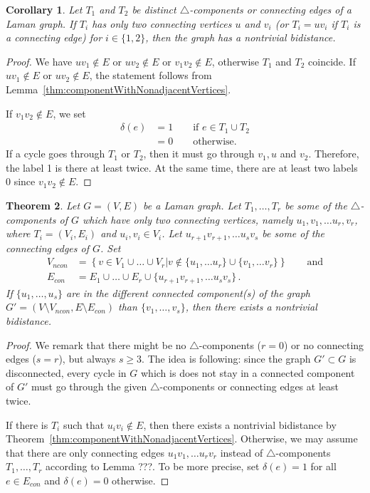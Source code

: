 \documentclass[a4paper, 11pt]{article}
\newcommand{\trcomps}{$\triangle$-components}
\newtheorem{thm}{Theorem}[section]
\newtheorem{cor}[thm]{Corollary}
\theoremstyle{definition}
\begin{document}
\begin{cor}
Let $T_1$ and $T_2$ be distinct \trcomps{} or connecting edges of a Laman graph. If $T_i$ has only two connecting vertices $u$ and $v_i$ (or $T_i=uv_i$ if $T_i$ is a connecting edge) for $i\in\{1,2\}$, then  the graph has a nontrivial bidistance.
\end{cor}
\begin{proof}
We have $uv_1\notin E$ or $uv_2\notin E$ or $v_1v_2\notin E$, otherwise $T_1$ and $T_2$ coincide.
If $uv_1\notin E$ or $uv_2\notin E$, the statement follows from Lemma~\ref{thm:componentWithNonadjacentVertices}.

If $v_1v_2\notin E$, we set 
\begin{align*}
\delta(e)&=1 \qquad \text{if } e\in T_1\cup T_2 \\
		&=0 \qquad \text{otherwise.}
\end{align*} 
If a cycle goes through $T_1$ or $T_2$, then it must go through  $v_1, u$ and $v_2$. Therefore, the label 1 is there at least twice. At the same time, there are at least two labels 0 since  $v_1v_2\notin E$.
\end{proof}

\begin{thm}
Let $G=(V,E)$ be a Laman graph. Let  $T_1, \dots, T_r$ be some of the \trcomps{} of $G$ which have only two connecting vertices, namely $u_1, v_1, \dots u_r,v_r$, where  $T_i=(V_i,E_i)$ and $u_i, v_i\in V_i$. Let  $u_{r+1}v_{r+1}, \dots u_s v_s$ be some of the connecting edges of $G$. Set 
\begin{align*}
V_{ncon}&=\left\{v\in V_1 \cup \dots \cup V_r | v\notin \{u_1, \dots u_r\}\cup \{v_1, \dots v_r\} \right\} \qquad \text{and} \\
E_{con}&=E_1 \cup \dots \cup E_r \cup \{u_{r+1}v_{r+1}, \dots u_s v_s\}\,.
\end{align*}
If $\{u_1, \dots, u_s\}$ are in the different connected component(s) of the graph $G'=(V\setminus V_{ncon},E\setminus E_{con})$ than $\{v_1, \dots, v_s\}$, then there exists a nontrivial bidistance.
\end{thm}
\begin{proof}
We remark that there might be no \trcomps{} ($r=0$) or no connecting edges ($s=r$), but always $s\geq 3$.
The idea is following: since the graph $G'\subset G$ is disconnected, every cycle in $G$ which is does not stay in a connected component of $G'$ must go through the given \trcomps{} or connecting edges at least twice.

If there is $T_i$ such that $u_i v_i \notin E$, then there exists a nontrivial bidistance by Theorem~\ref{thm:componentWithNonadjacentVertices}.
Otherwise, we may assume that there are only connecting edges  $u_1 v_1, \dots u_r v_r$ instead of \trcomps{} $T_1, \dots, T_r$ according to Lemma ???.
To be more precise, set $\delta(e)=1$ for all $e \in E_{con}$ and $\delta(e)=0$ otherwise. 
\end{proof}
\end{document}
